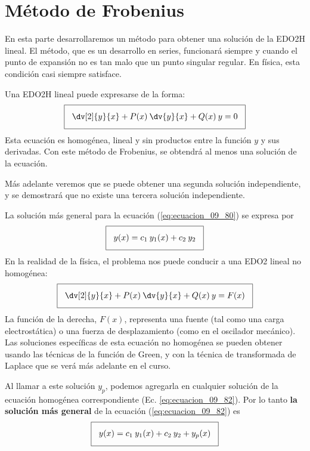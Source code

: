 \section{Método de Frobenius}
En esta parte desarrollaremos un método para obtener una solución de la EDO2H lineal. El método, que es un desarrollo en series, funcionará siempre y cuando el punto de expansión no es tan malo que un punto singular regular. En física, esta condición casi siempre satisface.
\par
Una EDO2H lineal puede expresarse de la forma:
\begin{align}
\setlength{\fboxsep}{3\fboxsep}\boxed{\dv[2]{y}{x} + P(x) \: \dv{y}{x} + Q(x) \: y = 0}
\label{eq:ecuacion_09_80}
\end{align}
Esta ecuación es homogénea, lineal y sin productos entre la función $y$ y sus derivadas. Con este método de Frobenius, se obtendrá al menos una solución de la ecuación.
\par
Más adelante veremos que se puede obtener una segunda solución independiente, y se demostrará que no existe una tercera solución independiente.
\par
La solución más general para la ecuación (\ref{eq:ecuacion_09_80}) se expresa por
\begin{align}
\setlength{\fboxsep}{3\fboxsep}\boxed{y(x) = c_{1} \: y_{1}(x) + c_{2} \: y_{2}}
\label{eq:ecuacion_09_81}
\end{align}
En la realidad de la física, el problema nos puede conducir a una EDO2 lineal no homogénea:
\begin{align}
\setlength{\fboxsep}{3\fboxsep}\boxed{\dv[2]{y}{x} + P(x) \: \dv{y}{x} + Q(x) \: y = F(x)}
\label{eq:ecuacion_09_82}
\end{align}
La función de la derecha, $F(x)$, representa una fuente (tal como una carga electrostática) o una fuerza de desplazamiento (como en el oscilador mecánico). Las soluciones específicas de esta ecuación no homogénea se pueden obtener usando las técnicas de la función de Green, y con la técnica de transformada de Laplace que se verá más adelante en el curso.
\par
Al llamar a este solución $y_{p}$, podemos agregarla en cualquier solución de la ecuación homogénea correspondiente (Ec. \ref{eq:ecuacion_09_82}). Por lo tanto \textbf{la solución más general} de la ecuación (\ref{eq:ecuacion_09_82}) es
\begin{align}
\setlength{\fboxsep}{3\fboxsep}\boxed{y(x) = c_{1} \: y_{1}(x) + c_{2} \: y_{2} + y_{p} (x) }
\label{eq:ecuacion_09_83}
\end{align}
